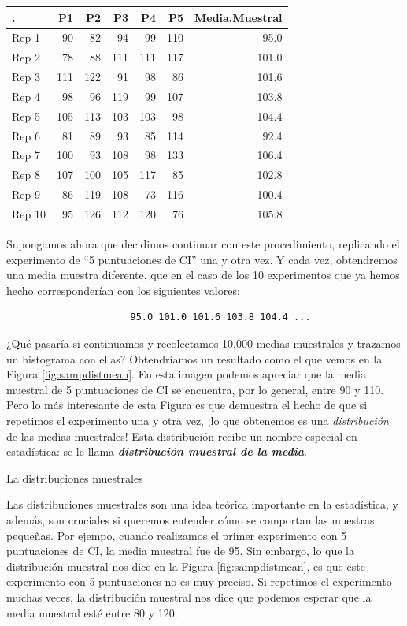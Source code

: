 \documentclass[spanish,]{book}
\begin{document}
\begin{tabular}{l|r|r|r|r|r|r}
\hline
. & P1 & P2 & P3 & P4 & P5 & Media.Muestral\\
\hline
Rep 1 & 90 & 82 & 94 & 99 & 110 & 95.0\\
\hline
Rep 2 & 78 & 88 & 111 & 111 & 117 & 101.0\\
\hline
Rep 3 & 111 & 122 & 91 & 98 & 86 & 101.6\\
\hline
Rep 4 & 98 & 96 & 119 & 99 & 107 & 103.8\\
\hline
Rep 5 & 105 & 113 & 103 & 103 & 98 & 104.4\\
\hline
Rep 6 & 81 & 89 & 93 & 85 & 114 & 92.4\\
\hline
Rep 7 & 100 & 93 & 108 & 98 & 133 & 106.4\\
\hline
Rep 8 & 107 & 100 & 105 & 117 & 85 & 102.8\\
\hline
Rep 9 & 86 & 119 & 108 & 73 & 116 & 100.4\\
\hline
Rep 10 & 95 & 126 & 112 & 120 & 76 & 105.8\\
\hline
\end{tabular}

Supongamos ahora que decidimos continuar con este procedimiento,
replicando el experimento de ``5 puntuaciones de CI'' una y otra vez. Y
cada vez, obtendremos una media muestra diferente, que en el caso de los
10 experimentos que ya hemos hecho corresponderían con los siguientes
valores:

\begin{verbatim}
                      95.0 101.0 101.6 103.8 104.4 ...
\end{verbatim}

¿Qué pasaría si continuamos y recolectamos 10,000 medias muestrales y
trazamos un histograma con ellas? Obtendríamos un resultado como el que
vemos en la Figura \ref{fig:sampdistmean}. En esta imagen podemos
apreciar que la media muestral de 5 puntuaciones de CI se encuentra, por
lo general, entre 90 y 110. Pero lo más interesante de esta Figura es
que demuestra el hecho de que si repetimos el experimento una y otra
vez, ¡lo que obtenemos es una \emph{distribución} de las medias
muestrales! Esta distribución recibe un nombre especial en estadística:
se le llama \textbf{\emph{distribución muestral de la media}}.

La distribuciones muestrales

Las distribuciones muestrales son una idea teórica importante en la
estadística, y además, son cruciales si queremos entender cómo se
comportan las muestras pequeñas. Por ejempo, cuando realizamos el primer
experimento con 5 puntuaciones de CI, la media muestral fue de 95. Sin
embargo, lo que la distribución muestral nos dice en la Figura
\ref{fig:sampdistmean}, es que este experimento con 5 puntuaciones no es
muy preciso. Si repetimos el experimento muchas veces, la distribución
muestral nos dice que podemos esperar que la media muestral esté entre
80 y 120.
\end{document}
